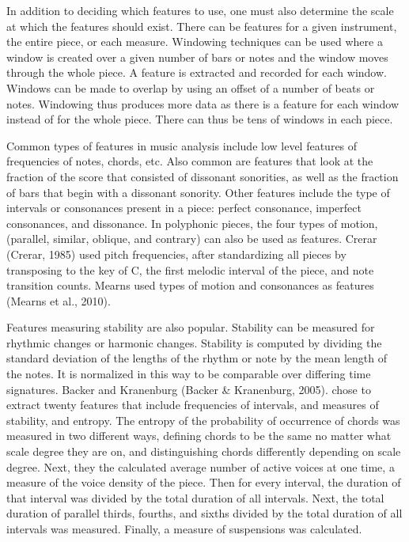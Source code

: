 \documentclass[12pt,twoside]{reedthesis}
\theoremstyle{definition}
\theoremstyle{definition}
\theoremstyle{definition}
\theoremstyle{remark}
\begin{document}
In addition to deciding which features to use, one must also determine
the scale at which the features should exist. There can be features for
a given instrument, the entire piece, or each measure. Windowing
techniques can be used where a window is created over a given number of
bars or notes and the window moves through the whole piece. A feature is
extracted and recorded for each window. Windows can be made to overlap
by using an offset of a number of beats or notes. Windowing thus
produces more data as there is a feature for each window instead of for
the whole piece. There can thus be tens of windows in each piece.

Common types of features in music analysis include low level features of
frequencies of notes, chords, etc. Also common are features that look at
the fraction of the score that consisted of dissonant sonorities, as
well as the fraction of bars that begin with a dissonant sonority. Other
features include the type of intervals or consonances present in a
piece: perfect consonance, imperfect consonances, and dissonance. In
polyphonic pieces, the four types of motion, (parallel, similar,
oblique, and contrary) can also be used as features. Crerar (Crerar,
1985) used pitch frequencies, after standardizing all pieces by
transposing to the key of C, the first melodic interval of the piece,
and note transition counts. Mearns used types of motion and consonances
as features (Mearns et al., 2010).

Features measuring stability are also popular. Stability can be measured
for rhythmic changes or harmonic changes. Stability is computed by
dividing the standard deviation of the lengths of the rhythm or note by
the mean length of the notes. It is normalized in this way to be
comparable over differing time signatures. Backer and Kranenburg (Backer
\& Kranenburg, 2005). chose to extract twenty features that include
frequencies of intervals, and measures of stability, and entropy. The
entropy of the probability of occurrence of chords was measured in two
different ways, defining chords to be the same no matter what scale
degree they are on, and distinguishing chords differently depending on
scale degree. Next, they the calculated average number of active voices
at one time, a measure of the voice density of the piece. Then for every
interval, the duration of that interval was divided by the total
duration of all intervals. Next, the total duration of parallel thirds,
fourths, and sixths divided by the total duration of all intervals was
measured. Finally, a measure of suspensions was calculated.
\end{document}
